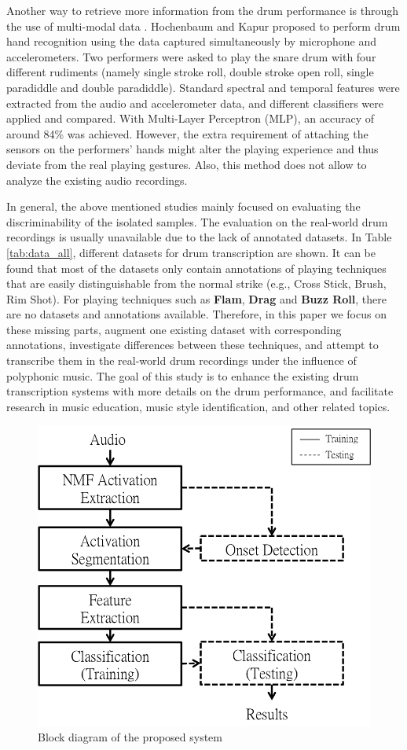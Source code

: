 \documentclass{article}
\begin{document}
Another way to retrieve more information from the drum performance is through the use of multi-modal data \cite{Hochenbaum2011}. Hochenbaum and Kapur proposed to perform drum hand recognition using the data captured simultaneously by microphone and accelerometers. Two performers were asked to play the snare drum with four different rudiments (namely single stroke roll, double stroke open roll, single paradiddle and double paradiddle). Standard spectral and temporal features were extracted from the audio and accelerometer data, and different classifiers were applied and compared. With Multi-Layer Perceptron (MLP), an accuracy of around 84\% was achieved. However, the extra requirement of attaching the sensors on the performers' hands might alter the playing experience and thus deviate from the real playing gestures. Also, this method does not allow to analyze the existing audio recordings. 

In general, the above mentioned studies mainly focused on evaluating the discriminability of the isolated samples. The evaluation on the real-world drum recordings is usually unavailable due to the lack of annotated datasets. In Table \ref{tab:data_all}, different datasets for drum transcription are shown. It can be found that most of the datasets only contain annotations of playing techniques that are easily distinguishable from the normal strike (e.g., Cross Stick, Brush, Rim Shot). For playing techniques such as \textbf{Flam}, \textbf{Drag} and \textbf{Buzz Roll}, there are no datasets and annotations available. Therefore, in this paper we focus on these missing parts, augment one existing dataset with corresponding annotations, investigate differences between these techniques, and attempt to transcribe them in the real-world drum recordings under the influence of polyphonic music. The goal of this study is to enhance the existing drum transcription systems with more details on the drum performance, and facilitate research in music education, music style identification, and other related topics. 


\begin{figure}
\centering
\includegraphics[width = 7 cm]{./figures/block_diagram.png}
\caption{Block diagram of the proposed system}
\label{fig:block}
\end{figure}
\end{document}
